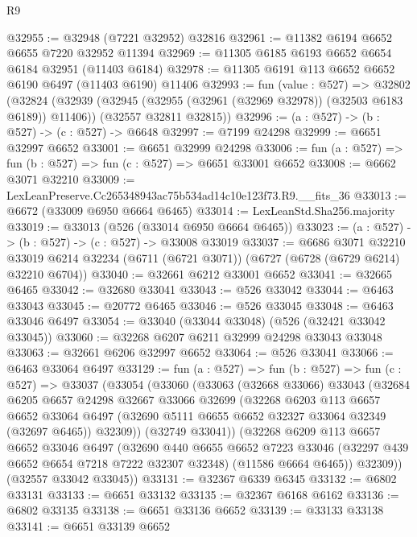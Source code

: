 \begin{lexlean}{R9}
\begin{coremodule}
@32955 := @32948 (@7221 @32952) @32816
@32961 := @11382 @6194 @6652 @6655 @7220 @32952 @11394
@32969 := @11305 @6185 @6193 @6652 @6654 @6184 @32951 (@11403 @6184)
@32978 := @11305 @6191 @113 @6652 @6652 @6190 @6497 (@11403 @6190) @11406
@32993 := fun (value : @527) =>
  @32802
    (@32824
      (@32939 (@32945 (@32955 (@32961 (@32969 @32978)) (@32503 @6183 @6189)) @11406))
      (@32557 @32811 @32815))
@32996 := (a : @527) -> (b : @527) -> (c : @527) -> @6648
@32997 := @7199 @24298
@32999 := @6651 @32997 @6652
@33001 := @6651 @32999 @24298
@33006 := fun (a : @527) => fun (b : @527) => fun (c : @527) => @6651 @33001 @6652
@33008 := @6662 @3071 @32210
@33009 := LexLeanPreserve.Cc265348943ac75b534ad14c10e123f73.R9.__fits_36
@33013 := @6672 (@33009 @6950 @6664 @6465)
@33014 := LexLeanStd.Sha256.majority
@33019 := @33013 (@526 (@33014 @6950 @6664 @6465))
@33023 := (a : @527) -> (b : @527) -> (c : @527) -> @33008 @33019
@33037 := @6686
    @3071
    @32210
    @33019
    @6214
    @32234
    (@6711 (@6721 @3071))
    (@6727 (@6728 (@6729 @6214) @32210 @6704))
@33040 := @32661 @6212 @33001 @6652
@33041 := @32665 @6465
@33042 := @32680 @33041
@33043 := @526 @33042
@33044 := @6463 @33043
@33045 := @20772 @6465
@33046 := @526 @33045
@33048 := @6463 @33046 @6497
@33054 := @33040 (@33044 @33048) (@526 (@32421 @33042 @33045))
@33060 := @32268 @6207 @6211 @32999 @24298 @33043 @33048
@33063 := @32661 @6206 @32997 @6652
@33064 := @526 @33041
@33066 := @6463 @33064 @6497
@33129 := fun (a : @527) =>
  fun (b : @527) =>
  fun (c : @527) =>
  @33037
    (@33054
      (@33060
        (@33063
          (@32668 @33066)
          @33043
          (@32684
            @6205
            @6657
            @24298
            @32667
            @33066
            @32699
            (@32268
              @6203
              @113
              @6657
              @6652
              @33064
              @6497
              (@32690 @5111 @6655 @6652 @32327 @33064 @32349 (@32697 @6465))
              @32309))
          (@32749 @33041))
        (@32268
          @6209
          @113
          @6657
          @6652
          @33046
          @6497
          (@32690
            @440
            @6655
            @6652
            @7223
            @33046
            (@32297 @439 @6652 @6654 @7218 @7222 @32307 @32348)
            (@11586 @6664 @6465))
          @32309))
      (@32557 @33042 @33045))
@33131 := @32367 @6339 @6345
@33132 := @6802 @33131
@33133 := @6651 @33132
@33135 := @32367 @6168 @6162
@33136 := @6802 @33135
@33138 := @6651 @33136 @6652
@33139 := @33133 @33138
@33141 := @6651 @33139 @6652

\end{coremodule}
\end{lexlean}
